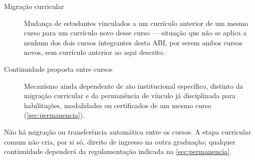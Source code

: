 \begin{description}
    \item[Migração curricular] Mudança de estudantes vinculados a um currículo anterior de um mesmo curso para um currículo novo desse curso — situação que não se aplica a nenhum dos dois cursos integrantes desta ABI, por serem ambos cursos novos, sem currículo anterior ao aqui descrito.
    \item[Continuidade proposta entre cursos] Mecanismo ainda dependente de ato institucional específico, distinto da migração curricular e da permanência de vínculo já disciplinada para habilitações, modalidades ou certificados de um mesmo curso (\autoref{sec:permanencia}).
\end{description}

Não há migração ou transferência automática entre os cursos. A etapa curricular comum não cria, por si só, direito de ingresso na outra graduação; qualquer continuidade dependerá da regulamentação indicada na \autoref{sec:permanencia}.
